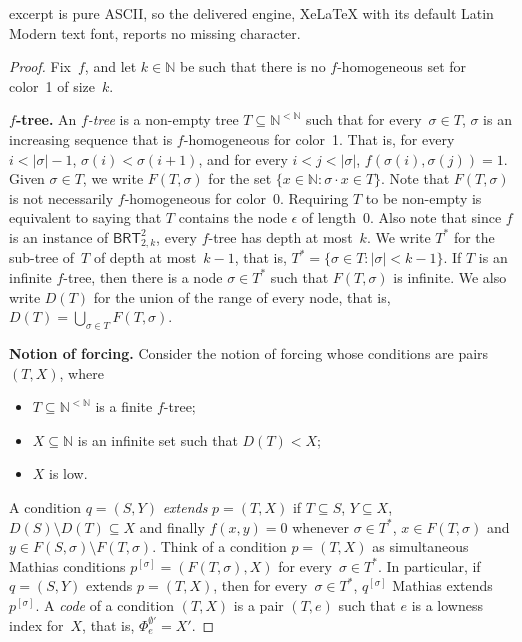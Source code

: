 \documentclass[10pt,a4paper]{amsart}
\newcommand{\BRT}[0]{\mathsf{BRT}}
\newcommand{\NN}[0]{\mathbb{N}}
\begin{document}
excerpt is pure ASCII, so the delivered engine, XeLaTeX with its default Latin Modern text font, reports no missing character.

\begin{proof}
Fix~$f$, and let $k \in \NN$ be such that there is no $f$-homogeneous set for color~1 of size~$k$.
\bigskip

\noindent
\textbf{$f$-tree.}
An \emph{$f$-tree} is a non-empty tree $T \subseteq \NN^{<\NN}$ such that for every~$\sigma \in T$, 
$\sigma$ is an increasing sequence that is $f$-homogeneous for color~1.  That is, for every $i < |\sigma|-1$, $\sigma(i) < \sigma(i+1)$, and for every $i < j < |\sigma|$, $f(\sigma(i), \sigma(j)) = 1$. 
Given $\sigma \in T$, we write $F(T, \sigma)$ for the set $\{ x \in \NN : \sigma \cdot x \in T \}$. Note that $F(T, \sigma)$ is not necessarily $f$-homogeneous for color~0. Requiring $T$ to be non-empty is equivalent to saying that $T$ contains the node $\epsilon$ of length~0. Also note that since $f$ is an instance of $\BRT^2_{2,k}$, every $f$-tree has depth at most~$k$. We write $T^*$ for the sub-tree of~$T$ of depth at most~$k-1$, that is, $T^* = \{ \sigma \in T : |\sigma| < k-1\}$. If $T$ is an infinite $f$-tree, then there is a node $\sigma \in T^*$ such that $F(T, \sigma)$ is infinite. We also write $D(T)$ for the union of the range of every node, that is, $D(T) = \bigcup_{\sigma \in T} F(T, \sigma)$.
\bigskip

\noindent
\textbf{Notion of forcing.}
Consider the notion of forcing whose conditions are pairs $(T, X)$, where
\begin{itemize}
    \item[(1)] $T \subseteq \NN^{<\NN}$ is a finite $f$-tree;
    \item[(2)] $X \subseteq \NN$ is an infinite set such that $D(T) < X$;
    \item[(3)] $X$ is low.
\end{itemize}
A condition $q = (S, Y)$ \emph{extends} $p = (T, X)$ if $T \subseteq S$, $Y \subseteq X$, $D(S) \setminus D(T) \subseteq X$ and finally $f(x,y) = 0$ whenever $\sigma \in T^*$, $x \in F(T, \sigma)$ and $y \in F(S, \sigma) \setminus F(T, \sigma)$.
Think of a condition $p = (T, X)$ as simultaneous Mathias conditions $p^{[\sigma]} = (F(T, \sigma), X)$ for every~$\sigma \in T^*$. In particular, if $q = (S, Y)$ extends $p = (T, X)$, then for every~$\sigma \in T^*$, $q^{[\sigma]}$ Mathias extends $p^{[\sigma]}$. A \emph{code} of a condition $(T, X)$ is a pair $(T, e)$ such that $e$ is a lowness index for~$X$, that is, $\Phi_e^{\emptyset'} = X'$. 


\end{proof}
\end{document}
